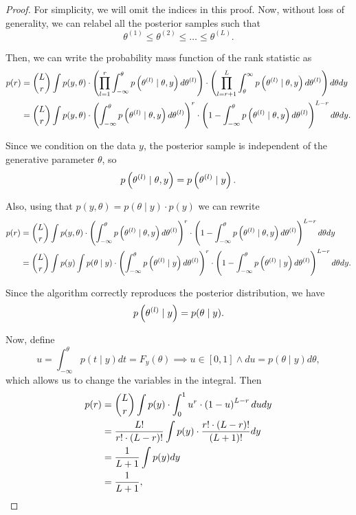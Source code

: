 \begin{proof}
    For simplicity, we will omit the indices in this proof.
    Now, without loss of generality, we can relabel all the posterior samples such that
    \[\theta^{(1)} \leq \theta^{(2)} \leq \dots \leq \theta^{(L)}.\]

    Then, we can write the probability mass function of the rank statistic as
    \begin{align*}
        p(r) & = \binom{L}{r} \int p(y, \theta)
                \cdot \left({\prod_{l=1}^{r} \int_{-\infty}^{\theta} p\left({\theta^{(l)}\mid \theta, y}\right) d\theta^{(l)}}\right)
                \cdot \left({\prod_{l=r+1}^{L} \int_{\theta}^{\infty} p\left({\theta^{(l)}\mid \theta, y}\right) d\theta^{(l)}}\right)
                d\theta dy \\
             & = \binom{L}{r} \int p(y, \theta)
                \cdot \left({\int_{-\infty}^{\theta} p\left({\theta^{(l)}\mid \theta, y}\right) d\theta^{(l)}}\right)^r
                \cdot \left({1 - \int_{-\infty}^{\theta} p\left({\theta^{(l)}\mid \theta, y}\right) d\theta^{(l)}}\right)^{L-r}
                d\theta dy.
    \end{align*}

    Since we condition on the data $y$, the posterior sample is independent of the generative parameter $\theta$, so
    \[p\left({\theta^{(l)}\mid \theta, y}\right) = p\left({\theta^{(l)}\mid y}\right).\]

    Also, using that $p(y, \theta) = p(\theta \mid y)\cdot p(y)$ we can rewrite
    \begin{align*}
        p(r) & = \binom{L}{r} \int p(y, \theta)
                \cdot \left({\int_{-\infty}^{\theta} p\left({\theta^{(l)}\mid \theta, y}\right) d\theta^{(l)}}\right)^r
                \cdot \left({1 - \int_{-\infty}^{\theta} p\left({\theta^{(l)}\mid \theta, y}\right) d\theta^{(l)}}\right)^{L-r}
                d\theta dy \\
             & = \binom{L}{r} \int p(y) \int p(\theta \mid y)
                \cdot \left({\int_{-\infty}^{\theta} p\left({\theta^{(l)}\mid y}\right) d\theta^{(l)}}\right)^r
                \cdot \left({1 - \int_{-\infty}^{\theta} p\left({\theta^{(l)}\mid y}\right) d\theta^{(l)}}\right)^{L-r}
                d\theta dy.
    \end{align*}

    Since the algorithm correctly reproduces the posterior distribution, we have
    \[p\left({\theta^{(l)} \mid y}\right) = p(\theta \mid y).\]

    Now, define
    \[u = \int_{-\infty}^{\theta} p(t \mid y) dt = F_y(\theta) \implies u \in [0, 1] \land du = p(\theta \mid y) d\theta,\]
    \noindent which allows us to change the variables in the integral. Then
    \begin{align*}
        p(r) & = \binom{L}{r} \int p(y) \cdot \int_0^1 u^r \cdot \left({1 - u}\right)^{L-r} du dy \\
             & = \dfrac{L!}{r! \cdot (L - r)!} \int p(y) \cdot \dfrac{r! \cdot (L - r)!}{(L + 1)!} dy \\
             & = \dfrac{1}{L + 1} \int p(y) dy \\
             & = \dfrac{1}{L + 1},
    \end{align*}


\end{proof}
